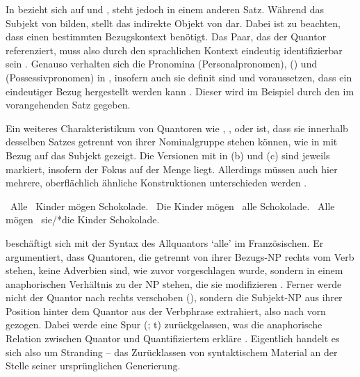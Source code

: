 In  bezieht sich  auf  und ,
steht jedoch in einem anderen Satz. Während  das Subjekt
von  bilden, stellt  das indirekte Objekt von
 dar. Dabei ist zu beachten, dass  einen
bestimmten Bezugskontext benötigt. Das Paar, das der Quantor
referenziert, muss also durch den sprachlichen Kontext eindeutig
identifizierbar sein
\autocites[vgl.~z.\,B.][274]{lyons1999}[788]{schwartz2000}[983]{janssen2004}.
Genauso verhalten sich die Pronomina  (Personalpronomen), 
() und  (Possessivpronomen) in
, insofern auch sie definit sind und
voraussetzen, dass ein eindeutiger Bezug hergestellt werden kann
\autocites[vgl.][145--148]{lyons1999}. Dieser wird im Beispiel durch den
 im vorangehenden Satz gegeben.

Ein weiteres Charakteristikum von Quantoren wie ,
,  oder  ist, dass sie innerhalb desselben
Satzes getrennt von ihrer Nominalgruppe stehen können, wie in
 mit Bezug auf das Subjekt gezeigt. Die Versionen mit
 in (b) und (c) sind jeweils markiert, insofern der
Fokus auf der Menge liegt. Allerdings müssen auch hier mehrere,
oberflächlich ähnliche Konstruktionen unterschieden werden
\autocites[27--28]{pittner1995}[65--67]{fanselowcavar2002}.

\begin{exe}
\ex \label{ex:floatsubj}
\begin{xlist}
	\ex \label{ex:floatsubj_1}
		{\ob}~Alle {\ob}~Kinder{\cb}{\cb} mögen Schokolade.
	\ex \label{ex:floatsubj_2}
		{\ob}~Die Kinder{\cb} mögen {\ob}~alle{\cb}
		Schokolade.
	\ex \label{ex:floatsubj_3}
		{\ob}~Alle{\cb} mögen {\ob}~sie/*die
		Kinder{\cb} Schokolade.
\end{xlist}
\end{exe}

\citet{sportiche1988} beschäftigt sich mit der Syntax des Allquantors 
`alle' im Französischen. Er argumentiert, dass Quantoren, die
getrennt von ihrer Bezugs-NP rechts vom Verb stehen, keine Adverbien
sind, wie zuvor vorgeschlagen wurde, sondern in einem anaphorischen
Verhältnis zu der NP stehen, die sie modifizieren
\autocite[428--433]{sportiche1988}. Ferner werde nicht der Quantor nach rechts
verschoben (), sondern die Subjekt-NP aus ihrer Position hinter
dem Quantor aus der Verbphrase extrahiert, also nach vorn gezogen. Dabei werde
eine Spur (; t) zurückgelassen, was die anaphorische
Relation zwischen Quantor und Quantifiziertem erkläre
\autocite[432--433]{sportiche1988}. Eigentlich handelt es sich also um
Stranding -- das Zurücklassen von syntaktischem Material an der Stelle seiner
ursprünglichen Generierung.

